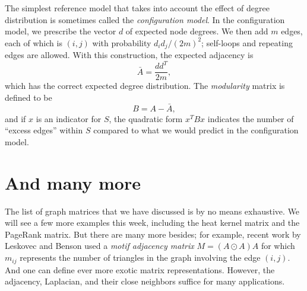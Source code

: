 \documentclass[12pt, leqno]{article} %
\begin{document}
The simplest reference model that takes into account the effect of
degree distribution is sometimes called the {\em configuration model}.
In the configuration model, we prescribe the vector $d$ of expected
node degrees.  We then add $m$ edges, each of which is $(i,j)$ with
probability $d_i d_j/(2m)^2$; self-loops and repeating edges are
allowed.  With this construction, the expected adjacency is
\[
  \bar{A} = \frac{dd^T}{2m},
\]
which has the correct expected degree distribution.  
The {\em modularity} matrix is defined to be
\[
  B = A-\bar{A},
\]
and if $x$ is an indicator for $S$, the quadratic form $x^T B x$
indicates the number of ``excess edges'' within $S$ compared to what
we would predict in the configuration model.

\section{And many more}

The list of graph matrices that we have discussed is by no means
exhaustive.  We will see a few more examples this week, including the
heat kernel matrix and the PageRank matrix.  But there are many more
besides; for example, recent work by Leskovec and Benson used a
{\em motif adjacency matrix} $M = (A \odot A) A$ for which $m_{ij}$
represents the number of triangles in the graph involving the edge $(i,j)$.
And one can define ever more exotic matrix representations.
However, the adjacency, Laplacian, and their close neighbors suffice
for many applications.
\end{document}
